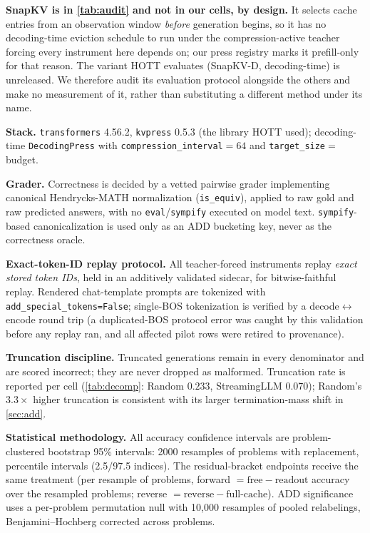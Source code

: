 \documentclass{article}
\begin{document}
\textbf{SnapKV is in \cref{tab:audit} and not in our cells, by design.} It selects cache entries from an observation window \emph{before} generation begins, so it has no decoding-time eviction schedule to run under the compression-active teacher forcing every instrument here depends on; our press registry marks it prefill-only for that reason. The variant HOTT evaluates (SnapKV-D, decoding-time) is unreleased. We therefore audit its evaluation protocol alongside the others and make no measurement of it, rather than substituting a different method under its name.

\textbf{Stack.} \texttt{transformers} 4.56.2, \texttt{kvpress} 0.5.3 (the library HOTT used); decoding-time \texttt{DecodingPress} with \texttt{compression\_interval}$=64$ and \texttt{target\_size}$=$ budget.

\textbf{Grader.} Correctness is decided by a vetted pairwise grader implementing canonical Hendrycks-MATH normalization (\texttt{is\_equiv}), applied to raw gold and raw predicted answers, with no \texttt{eval}/\texttt{sympify} executed on model text. \texttt{sympify}-based canonicalization is used only as an ADD bucketing key, never as the correctness oracle.

\textbf{Exact-token-ID replay protocol.} All teacher-forced instruments replay \emph{exact stored token IDs}, held in an additively validated sidecar, for bitwise-faithful replay. Rendered chat-template prompts are tokenized with \texttt{add\_special\_tokens=False}; single-BOS tokenization is verified by a decode$\leftrightarrow$encode round trip (a duplicated-BOS protocol error was caught by this validation before any replay ran, and all affected pilot rows were retired to provenance).

\textbf{Truncation discipline.} Truncated generations remain in every denominator and are scored incorrect; they are never dropped as malformed. Truncation rate is reported per cell (\cref{tab:decomp}: Random $0.233$, StreamingLLM $0.070$); Random's $3.3\times$ higher truncation is consistent with its larger termination-mass shift in \cref{sec:add}.

\textbf{Statistical methodology.} All accuracy confidence intervals are problem-clustered bootstrap 95\% intervals: 2000 resamples of problems with replacement, percentile intervals (2.5/97.5 indices). The residual-bracket endpoints receive the same treatment (per resample of problems, forward $= \text{free} - \text{readout}$ accuracy over the resampled problems; reverse $= \text{reverse} - \text{full-cache}$). ADD significance uses a per-problem permutation null with 10{,}000 resamples of pooled relabelings, Benjamini--Hochberg corrected across problems.
\end{document}
